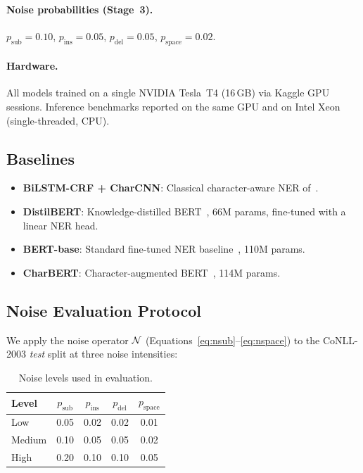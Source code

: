 \paragraph{Noise probabilities (Stage~3).}
$p_{\text{sub}}{=}0.10$, $p_{\text{ins}}{=}0.05$,
$p_{\text{del}}{=}0.05$, $p_{\text{space}}{=}0.02$.

\paragraph{Hardware.}
All models trained on a single NVIDIA Tesla~T4 (16\,GB) via Kaggle
GPU sessions.  Inference benchmarks reported on the same GPU and on
Intel Xeon (single-threaded, CPU).

\subsection{Baselines}

\begin{itemize}
  \item \textbf{BiLSTM-CRF + CharCNN}: Classical character-aware NER
        of~\citet{ma2016end}.
  \item \textbf{DistilBERT}: Knowledge-distilled BERT~\citep{sanh2019distilbert},
        66M params, fine-tuned with a linear NER head.
  \item \textbf{BERT-base}: Standard fine-tuned NER
        baseline~\citep{devlin2019bert}, 110M params.
  \item \textbf{CharBERT}: Character-augmented BERT~\citep{ma2020charbert},
        114M params.
\end{itemize}

\subsection{Noise Evaluation Protocol}

We apply the noise operator $\mathcal{N}$ (Equations~\ref{eq:nsub}--\ref{eq:nspace})
to the CoNLL-2003 \emph{test} split at three noise intensities:

\begin{table}[h]
\centering
\caption{Noise levels used in evaluation.}
\label{tab:noise_levels}
\begin{tabular}{lcccc}
\toprule
\textbf{Level} & $p_{\text{sub}}$ & $p_{\text{ins}}$ & $p_{\text{del}}$ & $p_{\text{space}}$ \\
\midrule
Low    & 0.05 & 0.02 & 0.02 & 0.01 \\
Medium & 0.10 & 0.05 & 0.05 & 0.02 \\
High   & 0.20 & 0.10 & 0.10 & 0.05 \\
\bottomrule
\end{tabular}
\end{table}

